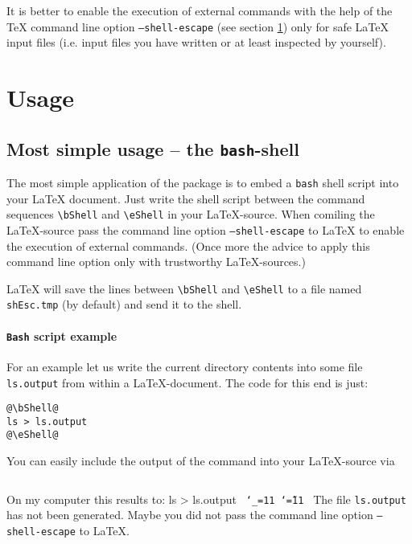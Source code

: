 It is better to enable the execution of external commands with the
help of the \TeX{} command line option \texttt{--shell-escape} (see
section \ref{sec:usage}) only for safe \LaTeX{} input files
(i.e. input files you have written or at least inspected by yourself).

\section{Usage}
\label{sec:usage}
\subsection{Most simple usage -- the \protect\texttt{bash}-shell}
The most simple application of the package is to embed a \texttt{bash}
shell script into your \LaTeX{} document. Just write the shell script
between the command sequences {\color{red}\verb=\bShell=} and
{\color{red}\verb=\eShell=} in your \LaTeX{}-source.
When comiling the \LaTeX{}-source pass the command line option
\texttt{--shell-escape} to \LaTeX{} to enable the execution of external
commands. (Once more the advice to apply this command line option only
with trustworthy \LaTeX-sources.)

\LaTeX{} will save the lines between \verb=\bShell= and \verb=\eShell=
to a file named \texttt{shEsc.tmp} (by default) and send it to the
shell.
\paragraph{\texttt{Bash} script example}
For an example let us write the current directory contents into some
file \texttt{ls.output} from within a \LaTeX{}-document. The code for
this end is just:
{
\makeatactive
{}
\begin{verbatim}
@\bShell@
ls > ls.output
@\eShell@
\end{verbatim}
}
You can easily include the output of the command into your
\LaTeX{}-source via
\begin{verbatim}

\end{verbatim}
On my computer this results to:
\bShell ls > ls.output\eShell
{}
{%
  \texttt{%
    \catcode`\_=11%
    \catcode`\~=11%
    }%
}{%
  The file
  \texttt{ls.output} has not been generated. Maybe you did not pass
  the command line option \texttt{--shell-escape} to \LaTeX.
}


